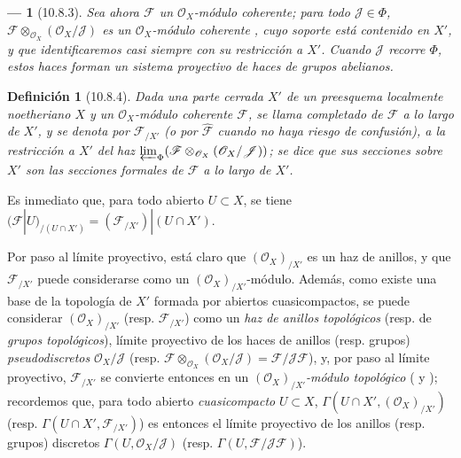\documentclass[oneside]{amsart}
\theoremstyle{ega-env-style}
\newtheorem*{env}{---}
\theoremstyle{ega-thm-env-style}
\theoremstyle{ega-defn-env-style}
\newtheorem*{definition}{Definición}
\newcommand{\oldpage}[2][]{{\marginnote{\normalfont{\textbf{#1}~|~#2}}}\ignorespaces}
\let\EGAOriginalLabel\label
\renewcommand{\label}[1]{\phantomsection\EGAOriginalLabel{#1}}
\begin{document}
\begin{env}[10.8.3]
\label{I.10.8.3}
Sea ahora $\mathscr{F}$ un $\mathscr{O}_X$-módulo \emph{coherente}; para todo $\mathscr{J}\in\Phi$, $\mathscr{F}\otimes_{\mathscr{O}_X}(\mathscr{O}_X/\mathscr{J})$ es un $\mathscr{O}_X$-módulo coherente , cuyo soporte está contenido en $X'$, y que identificaremos casi siempre con su restricción a $X'$.
Cuando $\mathscr{J}$ recorre $\Phi$, estos haces forman un \emph{sistema proyectivo} de haces de grupos abelianos.
\end{env}

\begin{definition}[10.8.4]
\label{I.10.8.4}
{\itshape Dada una parte cerrada $X'$ de un preesquema localmente noetheriano $X$ y un $\mathscr{O}_X$-módulo coherente $\mathscr{F}$, se llama completado de $\mathscr{F}$ a lo largo de $X'$, y se denota por $\mathscr{F}_{/X'}$ (o por $\widehat{\mathscr{F}}$ cuando no haya riesgo de confusión), a la restricción a $X'$ del haz
\oldpage[I]{195}
$\varprojlim_{\Phi}
(\mathscr{F}\otimes_{\mathscr{O}_X}
(\mathscr{O}_X/\mathscr{J}))$; se dice que sus secciones sobre $X'$ son las secciones formales de $\mathscr{F}$ a lo largo de $X'$.}
\end{definition}

Es inmediato que, para todo abierto $U\subset X$, se tiene $(\mathscr{F}|U)_{/(U\cap X')}=(\mathscr{F}_{/X'})|(U\cap X')$.

Por paso al límite proyectivo, está claro que $(\mathscr{O}_X)_{/X'}$ es un haz de anillos, y que $\mathscr{F}_{/X'}$ puede considerarse como un $(\mathscr{O}_X)_{/X'}$-módulo.
Además, como existe una base de la topología de $X'$ formada por abiertos cuasicompactos, se puede considerar $(\mathscr{O}_X)_{/X'}$ (resp. $\mathscr{F}_{/X'}$) como un \emph{haz de anillos topológicos} (resp. de \emph{grupos topológicos}), límite proyectivo de los haces de anillos (resp. grupos) \emph{pseudodiscretos} $\mathscr{O}_X/\mathscr{J}$ (resp. $\mathscr{F}\otimes_{\mathscr{O}_X}
(\mathscr{O}_X/\mathscr{J})=\mathscr{F}/\mathscr{J}\mathscr{F}$), y, por paso al límite proyectivo, $\mathscr{F}_{/X'}$ se convierte entonces en un \emph{$(\mathscr{O}_X)_{/X'}$-módulo topológico} ( y ); recordemos que, para todo abierto \emph{cuasicompacto} $U\subset X$, $\Gamma(U\cap X',(\mathscr{O}_X)_{/X'})$ (resp. $\Gamma(U\cap X',\mathscr{F}_{/X'})$) es entonces el límite proyectivo de los anillos (resp. grupos) discretos $\Gamma(U,\mathscr{O}_X/\mathscr{J})$ (resp. $\Gamma(U,\mathscr{F}/\mathscr{J}\mathscr{F})$).
\end{document}
